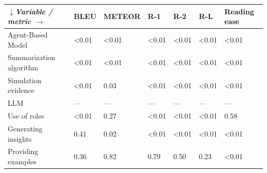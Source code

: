 \begin{tabular}{|l|l|l|l|l|l|l|}
\hline
\textit{$\downarrow$Variable / metric $\rightarrow$} & BLEU & METEOR & R-1 & R-2 & R-L & Reading ease \\
 \hline
 Agent-Based Model & \textless{}0.01 & \textless{}0.01 & \textless{}0.01 & \textless{}0.01 & \textless{}0.01 & \textless{}0.01 \\
 \hline
 Summarization algorithm & \textless{}0.01 & \textless{}0.01 & \textless{}0.01 & \textless{}0.01 & \textless{}0.01 & \textless{}0.01 \\
 \hline
 Simulation evidence & \textless{}0.01 & 0.03 & \textless{}0.01 & \textless{}0.01 & \textless{}0.01 & \textless{}0.01 \\
 \hline
 LLM & — & — & — & — & — & — \\
 \hline
 Use of roles & \textless{}0.01 & 0.27 & \textless{}0.01 & \textless{}0.01 & \textless{}0.01 & 0.58 \\
 \hline
 Generating insights & 0.41 & 0.02 & \textless{}0.01 & \textless{}0.01 & \textless{}0.01 & \textless{}0.01 \\
 \hline
 Providing examples & 0.36 & 0.82 & 0.79 & 0.50 & 0.23 & \textless{}0.01 \\
\hline
\end{tabular}
